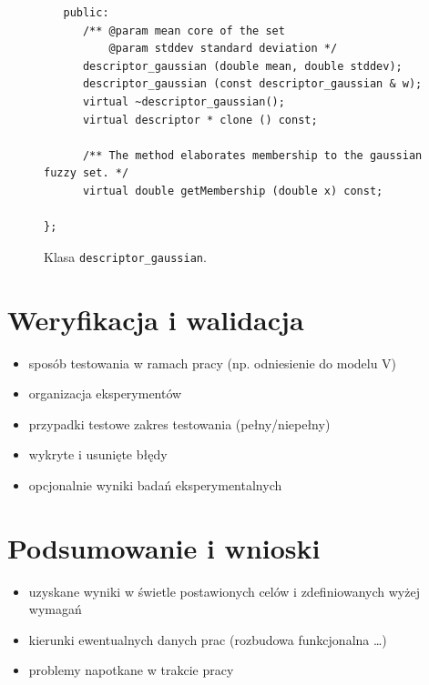 \documentclass[a4paper,twoside,12pt]{book}
\begin{document}
{\begin{figure}
\begin{lstlisting}
   public:
      /** @param mean core of the set
          @param stddev standard deviation */
      descriptor_gaussian (double mean, double stddev);
      descriptor_gaussian (const descriptor_gaussian & w);
      virtual ~descriptor_gaussian();
      virtual descriptor * clone () const;
      
      /** The method elaborates membership to the gaussian fuzzy set. */
      virtual double getMembership (double x) const;
     
};
\end{lstlisting}
\caption{Klasa \lstinline|descriptor_gaussian|.}
\label{fig:pseudokod}
\end{figure}


\chapter{Weryfikacja i walidacja}
\begin{itemize}
\item sposób testowania w ramach pracy (np. odniesienie do modelu V)
\item organizacja eksperymentów
\item przypadki testowe zakres testowania (pełny/niepełny)
\item wykryte i usunięte błędy
\item opcjonalnie wyniki badań eksperymentalnych
\end{itemize}
 


\chapter{Podsumowanie i wnioski}
\begin{itemize}
\item uzyskane wyniki w świetle postawionych celów i zdefiniowanych wyżej wymagań
\item kierunki ewentualnych danych prac (rozbudowa funkcjonalna …)
\item problemy napotkane w trakcie pracy
\end{itemize}


}
\end{document}
